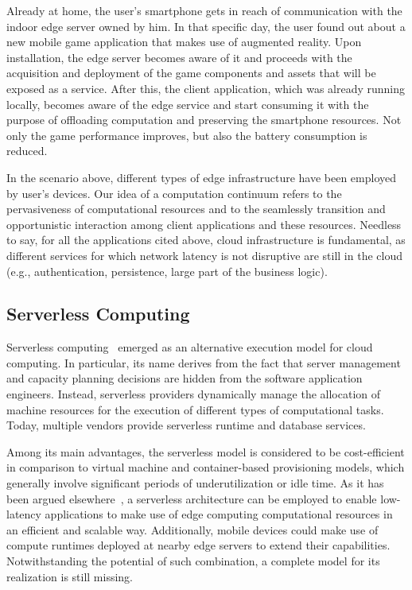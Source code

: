 Already at home, the user's smartphone gets in reach of communication with the indoor edge server owned by him. In that specific day, the user found out about a new mobile game application that makes use of augmented reality. Upon installation, the edge server becomes aware of it and proceeds with the acquisition and deployment of the game components and assets that will be exposed as a service. After this, the client application, which was already running locally, becomes aware of the edge service and start consuming it with the purpose of offloading computation and preserving the smartphone resources. Not only the game performance improves, but also the battery consumption is reduced.  

In the scenario above, different types of edge infrastructure have been employed by user's devices. Our idea of a computation continuum refers to the pervasiveness of computational resources and to the seamlessly transition and opportunistic interaction among client applications and these resources. Needless to say, for all the applications cited above, cloud infrastructure is  fundamental, as different services for which network latency is not disruptive are still in the cloud (e.g., authentication, persistence, large part of the business logic).

\subsection{Serverless Computing}

Serverless computing~\cite{} emerged as an alternative execution model for cloud computing. In particular, its name derives from the fact that server management and capacity planning decisions are hidden from the software application engineers. Instead, serverless providers dynamically manage the allocation of machine resources for the execution of different types of computational tasks. Today, multiple vendors provide serverless runtime and database services. 

Among its main advantages, the serverless model is considered to be cost-efficient in comparison to virtual machine and container-based provisioning models, which generally involve significant periods of underutilization or idle time. As it has been argued elsewhere~\cite{ESOCC'17}, a serverless architecture can be employed to enable low-latency applications to make use of edge computing computational resources in an efficient and scalable way. Additionally, mobile devices could make use of compute runtimes deployed at nearby edge servers to extend their capabilities. Notwithstanding the potential of such combination, a complete model for its realization is still missing. 

